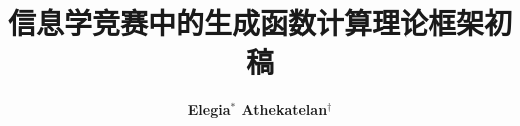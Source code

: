 \documentclass[12pt]{ctexart}
\title{\textbf{\Huge 信息学竞赛中的生成函数计算理论框架\quad\Large \color{gray}初稿}}
\author{\textbf{Elegia$^\ast$ Athekatelan$^\dag$}}
\date{}
\theoremstyle{plain}
\theoremstyle{definition}
\newif\ifcont
\begin{document}
\maketitle

\conttrue


\end{document}
